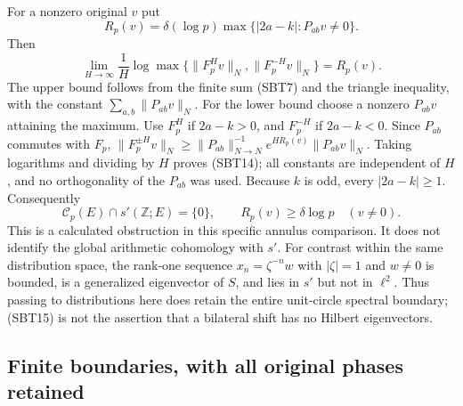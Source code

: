 \documentclass[11pt]{article}
\begin{document}
For a nonzero original $v$ put
\begin{equation}\tag{SBT13}
 R_p(v)=\delta(\log p)
       \max\{|2a-k|:P_{ab}v\ne0\}.
\end{equation}
Then
\begin{equation}\tag{SBT14}
 \lim_{H\to\infty}\frac1H
 \log\max\{\|F_p^Hv\|_N,\|F_p^{-H}v\|_N\}=R_p(v).
\end{equation}
The upper bound follows from the finite sum (SBT7) and the triangle
inequality, with the constant $\sum_{a,b}\|P_{ab}v\|_N$. For the
lower bound choose a nonzero $P_{ab}v$ attaining the maximum. Use
$F_p^H$ if $2a-k>0$, and $F_p^{-H}$ if $2a-k<0$.
Since $P_{ab}$ commutes with $F_p$,
$\|F_p^{\pm H}v\|_N\ge
\|P_{ab}\|_{N\to N}^{-1}e^{HR_p(v)}\|P_{ab}v\|_N$.
Taking logarithms and dividing by $H$ proves (SBT14); all constants
are independent of $H$, and no orthogonality of the $P_{ab}$ was used.
Because $k$ is odd, every $|2a-k|\ge1$. Consequently
\begin{equation}\tag{SBT15}
 \mathcal C_p(E)\cap s'(\mathbb Z;E)=\{0\},\qquad
 R_p(v)\ge\delta\log p\quad(v\ne0).
\end{equation}
This is a calculated obstruction in this specific annulus comparison.
It does not identify the global arithmetic cohomology with $s'$.
For contrast within the same distribution space, the rank-one
sequence $x_n=\zeta^{-n}w$ with $|\zeta|=1$ and $w\ne0$ is bounded,
is a generalized eigenvector of $S$, and lies in $s'$ but not in
$\ell^2$. Thus passing to distributions here does retain the entire
unit-circle spectral boundary; (SBT15) is not the assertion that a
bilateral shift has no Hilbert eigenvectors.

\subsection{Finite boundaries, with all original phases retained}
\end{document}
